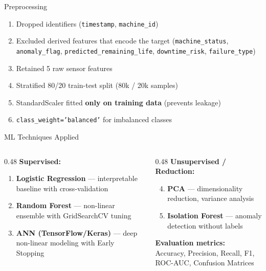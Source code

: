 \documentclass[aspectratio=169]{beamer}
\begin{document}
\begin{frame}{Preprocessing}
\begin{enumerate}
    \item Dropped identifiers (\texttt{timestamp}, \texttt{machine\_id})
    \item Excluded derived features that encode the target (\texttt{machine\_status}, \texttt{anomaly\_flag}, \texttt{predicted\_remaining\_life}, \texttt{downtime\_risk}, \texttt{failure\_type})
    \item Retained 5 raw sensor features
    \item Stratified 80/20 train-test split (80k / 20k samples)
    \item StandardScaler fitted \textbf{only on training data} (prevents leakage)
    \item \texttt{class\_weight='balanced'} for imbalanced classes
\end{enumerate}
\end{frame}

\begin{frame}{ML Techniques Applied}
\begin{columns}[T]
\begin{column}{0.48\textwidth}
\textbf{Supervised:}
\begin{enumerate}
    \item \textbf{Logistic Regression} --- interpretable baseline with cross-validation
    \item \textbf{Random Forest} --- non-linear ensemble with GridSearchCV tuning
    \item \textbf{ANN (TensorFlow/Keras)} --- deep non-linear modeling with Early Stopping
\end{enumerate}
\end{column}
\begin{column}{0.48\textwidth}
\textbf{Unsupervised / Reduction:}
\begin{enumerate}
    \setcounter{enumi}{3}
    \item \textbf{PCA} --- dimensionality reduction, variance analysis
    \item \textbf{Isolation Forest} --- anomaly detection without labels
\end{enumerate}

\vspace{0.3cm}
\textbf{Evaluation metrics:}\\
Accuracy, Precision, Recall, F1, ROC-AUC, Confusion Matrices
\end{column}
\end{columns}
\end{frame}
\end{document}
